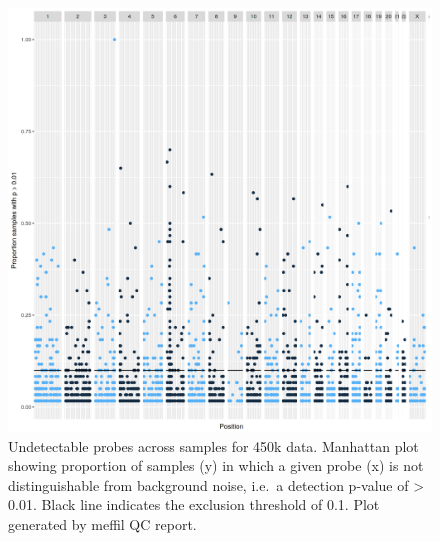 \documentclass[]{book}
\begin{document}
\begin{figure}

{\centering \includegraphics[width=0.8\linewidth]{figs/MAVIDOSqc450kpropSamples} 

}

\caption{Undetectable probes across samples for 450k data. Manhattan plot showing proportion of samples (y) in which a given probe (x) is not distinguishable from background noise, i.e.~a detection p-value of \textgreater{} 0.01. Black line indicates the exclusion threshold of 0.1. Plot generated by meffil QC report.}\label{fig:MAVIDOSqc450kpropSamples}
\end{figure}
\end{document}
